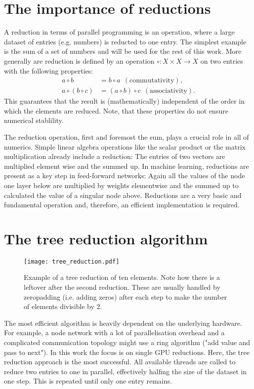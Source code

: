 \section{The importance of reductions}
A reduction in terms of parallel programming is an operation, where a large dataset of entries (e.g. numbers) is reducted to one entry.
The simplest example is the sum of a set of numbers and will be used for the rest of this work.
More generally are reduction is defined by an operation \( \circ: X \times X \rightarrow X \) on two entries with the following properties:
\begin{align}
    a \circ b &= b \circ a \ \ \mathrm{(commutativity)}, \\
    a \circ (b \circ c) &= (a \circ b) \circ c \ \ \mathrm{(associativity)}.
\end{align}
This guarantees that the result is (mathematically) independent of the order in which the elements are reduced.
Note, that these properties do not ensure numerical stablility.

The reduction operation, first and foremost the sum, plays a crucial role in all of numerics.
Simple linear algebra operations like the scalar product or the matrix multiplication already include a reduction:
The entries of two vectors are multiplied element wise and the summed up.
In machine learning, reductions are present as a key step in feed-forward networks:
Again all the values of the node one layer below are multiplied by weights elementwise and the summed up to calculated the value of a singular node above.
Reductions are a very basic and fundamental operation and, therefore, an efficient implementation is required. 

\section{The tree reduction algorithm}
\begin{figure}
    \centering
    \texttt{[image: tree\_reduction.pdf]}
    \caption{
        Example of a tree reduction of ten elements.
        Note how there is a leftover after the second reduction.
        These are usually handled by zeropadding (i.e. adding zeros) after each step to make the number of elements divisible by 2.
    }
\end{figure}
The most efficient algorithm is heavily dependent on the underlying hardware.
For example, a node network with a lot of parallelisation overhead and a complicated communication topology might use a ring algorithm ("add value and pass to next").
In this work the focus is on single GPU reductions.
Here, the tree reduction approach is the most successful.
All available threads are called to reduce two entries to one in parallel, effectively halfing the size of the dataset in one step.
This is repeated until only one entry remains.

